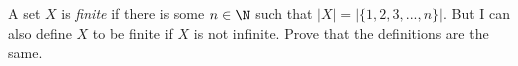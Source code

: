   A set $X$ is \textit{finite} if there is some $n \in \N$ such that
  $|X| = |\{1, 2, 3, ..., n\}|$.
  But I can also define $X$ to be finite if $X$ is not
  infinite.
  Prove that the definitions are the same.
